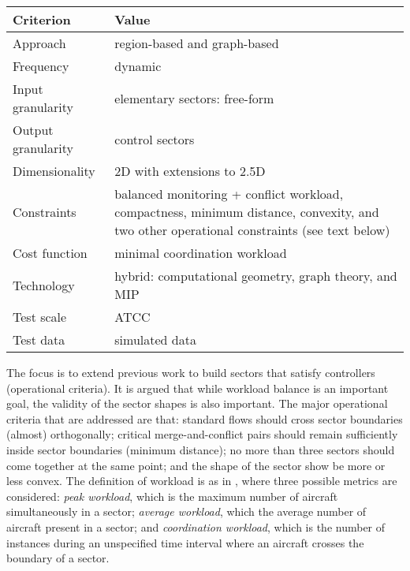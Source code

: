\documentclass[a4paper,12pt]{article}
\begin{document}
\begin{center}
\begin{tabular}{|l|l|}
  \hline
  Criterion & Value \\
  \hline\hline
  Approach & region-based and graph-based \\ \hline
  Frequency & dynamic \\ \hline
  Input granularity & elementary sectors: free-form \\ \hline
  Output granularity & control sectors \\ \hline
  Dimensionality & 2D with extensions to 2.5D \\ \hline
  Constraints & \parbox{11.5cm}{balanced monitoring + conflict
    workload, compactness, minimum distance, convexity, and two other
    operational constraints (see text below)} \\ \hline
  Cost function & minimal coordination workload \\ \hline
  Technology & hybrid: computational geometry, graph theory, and MIP \\ \hline
  Test scale & ATCC \\ \hline
  Test data & simulated data \\ \hline
\end{tabular}
\end{center}
The focus is to extend previous work \cite{Mitchell:GNC08} to build
sectors that satisfy controllers (operational criteria).  It is argued
that while workload balance is an important goal, the validity of the
sector shapes is also important.  The major operational criteria that
are addressed are that: standard flows should cross sector boundaries
(almost) orthogonally; critical merge-and-conflict pairs should remain
sufficiently inside sector boundaries (minimum distance); no more than
three sectors should come together at the same point; and the shape of
the sector show be more or less convex.  The definition of workload is
as in \cite{Mitchell:GNC08}, where three possible metrics are
considered: \emph{peak workload}, which is the maximum number of
aircraft simultaneously in a sector; \emph{average workload}, which
the average number of aircraft present in a sector; and
\emph{coordination workload}, which is the number of instances during
an unspecified time interval where an aircraft crosses the boundary of
a sector.

\subsection{\cite{Xue:GNC10}}
\end{document}
